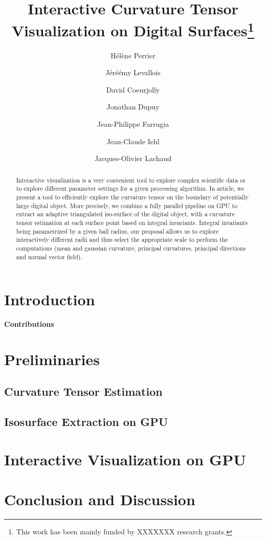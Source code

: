 \documentclass{llncs}
\title{Interactive Curvature Tensor  Visualization on Digital Surfaces\thanks{This work has been mainly funded by
   XXXXXXX  research
    grants.}}
\author{H\'el\`ene Perrier\inst{1}\and J\'eré\'emy Levallois\inst{1}\and  David Coeurjolly\inst{1}\and  Jonathan
  Dupuy\inst{1}\inst{2}\and   Jean-Philippe Farrugia\inst{1}\and Jean-Claude Iehl\inst{1}\and Jacques-Olivier Lachaud\inst{3} }
\institute{ Universit\'e de Lyon, CNRS\\
   INSA-Lyon, LIRIS, UMR5205, F-69621, France
   \and
 Universit\'ee de Montr\'eeal\\
LIGUM, Dept. I.R.O., Canada\\
\and
Universit\'e de Savoie, CNRS\\
LAMA, UMR5127, F-73776, France\\
}
\begin{document}
\maketitle


\begin{abstract}\sloppy
  Interactive visualization is a very convenient tool to explore
  complex scientific data or to explore different parameter settings
  for a given processing algorithm. In article, we present a tool to
  efficiently explore the curvature tensor on the boundary of
  potentially large digital object. More precisely, we combine a fully
  parallel pipeline on GPU to extract an adaptive triangulated
  iso-surface of the digital object, with a curvature tensor
  estimation at each surface point based on integral
  invariants. Integral invariants being parametrized by a given ball
  radius, our proposal allows us to explore interactively different
  radii and thus select the appropriate scale to  perform the
  computations (mean and gaussian curvature, principal curvatures,
  principal directions and normal vector field).

  
\end{abstract}

\section{Introduction}
\label{sec:introduction}



\textbf{Contributions}


\section{Preliminaries}
\label{sec:preliminaries}

\subsection{Curvature Tensor Estimation}
\label{sec:curv-tens-estim}

\subsection{Isosurface Extraction on GPU}
\label{sec:isos-extr-gpu}

\section{Interactive Visualization on GPU}
\label{sec:inter-visu-gpu}

\section{Conclusion and Discussion}
\label{sec:discussion}





\end{document}
